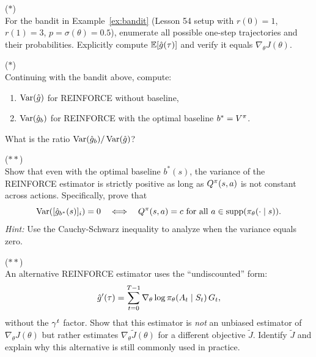 \documentclass[11pt,a4paper]{article}
\begin{document}
\begin{exercise} \textnormal{(\(*\))} \\
  For the bandit in Example~\ref{ex:bandit} (Lesson 54 setup with
  $r(0) = 1$, $r(1) = 3$, $p = \sigma(\theta) = 0.5$), enumerate all
  possible one-step trajectories and their probabilities. Explicitly
  compute $\mathbb{E}[\hat{g}(\tau)]$ and verify it equals $\nabla_\theta J(\theta)$.
\end{exercise}

\begin{exercise} \textnormal{(\(*\))} \\
  Continuing with the bandit above, compute:
  \begin{enumerate}[label=(\alph*)]
    \item $\operatorname{Var}(\hat{g})$ for REINFORCE without baseline,
    \item $\operatorname{Var}(\hat{g}_b)$ for REINFORCE with the optimal baseline
      $b^* = V^{\pi}$.
  \end{enumerate}
  What is the ratio $\operatorname{Var}(\hat{g}_b) / \operatorname{Var}(\hat{g})$?
\end{exercise}

\begin{exercise} \textnormal{(\(**\))} \\
  Show that even with the optimal baseline $b^*(s)$, the variance of the
  REINFORCE estimator is strictly positive as long as $Q^{\pi}(s,a)$ is not
  constant across actions. Specifically, prove that
  \[
    \operatorname{Var}([\hat{g}_{b^*}(s)]_i) = 0 \quad \Longleftrightarrow \quad
    Q^{\pi}(s,a) = c \text{ for all } a \in \operatorname{supp}(\pi_\theta(\cdot \mid s)).
  \]
  \textit{Hint:} Use the Cauchy-Schwarz inequality to analyze when
  the variance equals zero.
\end{exercise}

\begin{exercise} \textnormal{(\(**\))} \\
  An alternative REINFORCE estimator uses the ``undiscounted'' form:
  \[
    \hat{g}'(\tau) = \sum_{t=0}^{T-1} \nabla_\theta \log
    \pi_\theta(A_t \mid S_t)\, G_t,
  \]
  without the $\gamma^t$ factor. Show that this estimator is
  \emph{not} an unbiased estimator of $\nabla_\theta J(\theta)$ but
  rather estimates $\nabla_\theta \tilde{J}(\theta)$ for a different
  objective $\tilde{J}$. Identify $\tilde{J}$ and explain why this
  alternative is still commonly used in practice.
\end{exercise}
\end{document}
